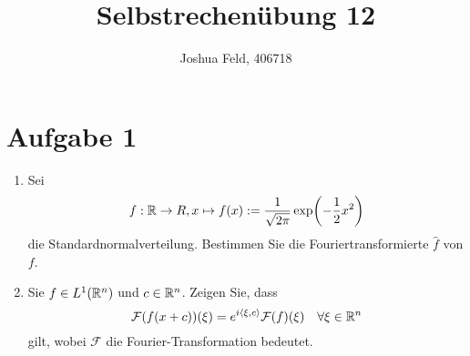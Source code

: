\documentclass{exercise}
\institute{Applied and Computational Mathematics}
\title{Selbstrechenübung 12}
\author{Joshua Feld, 406718}
\begin{document}
    \maketitle


    \section*{Aufgabe 1}
    
    \begin{problem}
        \begin{enumerate}
            \item Sei
            \[
                f: \R \to R, x \mapsto f\parentheses*{x} := \frac{1}{\sqrt{2\pi}}\exp\parentheses*{-\frac{1}{2}x^2}
            \]
            die Standardnormalverteilung.
            Bestimmen Sie die Fouriertransformierte \(\hat{f}\) von \(f\).
            \item Sie \(f \in L^1\parentheses*{\R^n}\) und \(c \in \mathbb{R}^n\).
            Zeigen Sie, dass
            \[
                \mathcal{F}\parentheses*{f\parentheses*{x + c}}\parentheses*{\xi} = e^{i\angles*{\xi, c}}\mathcal{F}\parentheses*{f}\parentheses*{\xi} \quad \forall\xi \in \R^n
            \]
            gilt, wobei \(\mathcal{F}\) die Fourier-Transformation bedeutet.
        \end{enumerate}
    \end{problem}
    
\end{document}
